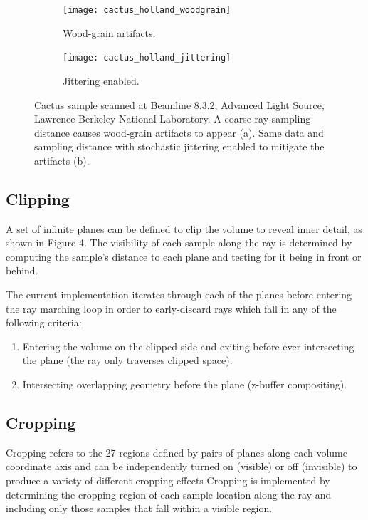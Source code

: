 \begin{figure}[htb]
\centering
  \begin{subfigure}[b]{.5\columnwidth}
    \centering
    \texttt{[image: cactus\_holland\_woodgrain]}
    \caption{Wood-grain artifacts.}
    \label{fig:jittering_without}
  \end{subfigure}%
  \begin{subfigure}[b]{.5\columnwidth}
    \centering
    \texttt{[image: cactus\_holland\_jittering]}
    \caption{Jittering enabled.}
    \label{fig:jittering_with}
  \end{subfigure}
  \caption{Cactus sample scanned at Beamline 8.3.2, Advanced Light Source,
  Lawrence Berkeley National Laboratory. A coarse ray-sampling distance causes
  wood-grain artifacts to appear (a). Same data and sampling distance with
  stochastic jittering enabled to mitigate the artifacts (b).}
  \label{fig:jittering}
\end{figure}

\subsection{Clipping}
\label{clipping}
A set of infinite planes can be defined to clip the volume to reveal inner
detail, as shown in Figure 4.  The visibility of each sample along the ray
is determined by computing the sample's distance to each plane and testing
for it being in front or behind.

The current implementation iterates through each of the planes before entering
the ray marching loop in order to early-discard rays which fall in any of the
following criteria:

\begin{enumerate}
\item Entering the volume on the clipped side and exiting before ever
  intersecting the plane (the ray only traverses clipped space).
\item Intersecting overlapping geometry before the plane (z-buffer compositing).
\end{enumerate}

\subsection{Cropping}
\label{cropping}
Cropping refers to the 27 regions defined by pairs of
planes along each volume coordinate axis and can be independently turned
on (visible) or off (invisible) to produce a variety of different cropping
effects%
Cropping is implemented by determining the cropping region of each sample
location along the ray and including only those samples that fall within
a visible region.


